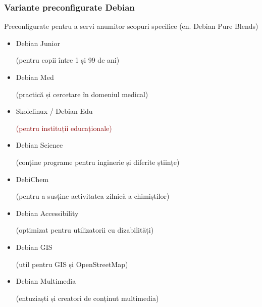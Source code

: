 \documentclass[xcolor=dvipsnames]{beamer}
\begin{document}
\begin{frame}
\frametitle{Variante preconfigurate Debian}
\begin{block}
{Preconfigurate pentru a servi anumitor scopuri specifice}
(en. Debian Pure Blends)\\
\begin{itemize}
\item Debian Junior
	\begin{footnotesize}
		(pentru copii între 1 și 99 de ani)
	\end{footnotesize} 
\item Debian Med
	\begin{footnotesize}
		(practică și cercetare în domeniul medical)
	\end{footnotesize} 
\item Skolelinux / Debian Edu
	\begin{footnotesize}
		\textcolor{darkred}{(pentru instituții educaționale)}
	\end{footnotesize} 
\item \textcolor{fade}{Debian Science}
	\begin{footnotesize}
		\textcolor{fade}{(conține programe pentru inginerie și diferite științe)}
	\end{footnotesize} 
\item \textcolor{fade}{DebiChem}
	\begin{footnotesize}
		\textcolor{fade}{(pentru a susține activitatea zilnică a chimiștilor)}
	\end{footnotesize} 
\item \textcolor{fade}{Debian Accessibility}
	\begin{footnotesize}
		\textcolor{fade}{(optimizat pentru utilizatorii cu dizabilități)}
	\end{footnotesize} 
\item \textcolor{fade}{Debian GIS}
	\begin{footnotesize}
		\textcolor{fade}{(util pentru GIS și OpenStreetMap)}
	\end{footnotesize} 
\item \textcolor{fade}{Debian Multimedia}
	\begin{footnotesize}
		\textcolor{fade}{(entuziaști și creatori de conținut multimedia)}
	\end{footnotesize} 
\end{itemize}
\end{block}
\end{frame}
\end{document}
